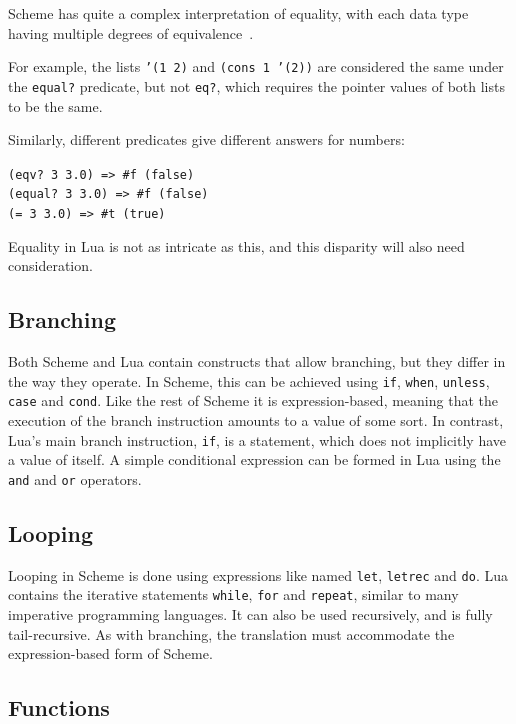 Scheme has quite a complex interpretation of equality, with each data type
having multiple degrees of equivalence~\cite[Sec~6.2]{tspl}.
\begin{framed}
For example, the lists \texttt{'(1 2)} and \texttt{(cons 1 '(2))} are considered
the same under the \texttt{equal?} predicate, but not \texttt{eq?}, which
requires the pointer values of both lists to be the same.

Similarly, different predicates give different answers for numbers:
\begin{center}
\ttfamily
\verb|(eqv? 3 3.0) => #f (false)| \\
\verb|(equal? 3 3.0) => #f (false)| \\
\verb|(= 3 3.0) => #t (true)|
\end{center}
\end{framed}
Equality in Lua is not as intricate as this, and this disparity will also need
consideration.

\subsection{Branching}

Both Scheme and Lua contain constructs that allow branching, but they differ in
the way they operate. In Scheme, this can be achieved using \texttt{if},
\texttt{when}, \texttt{unless}, \texttt{case} and \texttt{cond}. Like the rest
of Scheme it is expression-based, meaning that the execution of the branch
instruction amounts to a value of some sort. In contrast, Lua's main branch
instruction, \texttt{if}, is a statement, which does not implicitly have a value
of itself. A simple conditional expression can be formed in Lua using the
\texttt{and} and \texttt{or} operators.

\subsection{Looping}

Looping in Scheme is done using expressions like named \texttt{let},
\texttt{letrec} and \texttt{do}. Lua contains the iterative statements
\texttt{while}, \texttt{for} and \texttt{repeat}, similar to many imperative
programming languages. It can also be used recursively, and is fully
tail-recursive. As with branching, the translation must accommodate the
expression-based form of Scheme.

\subsection{Functions}

